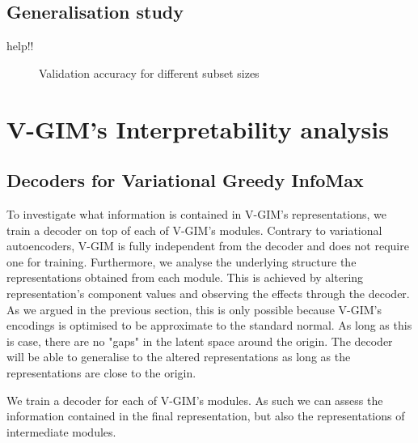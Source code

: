 	\subsection{Generalisation study}
		help!!
		
		\begin{figure}[h] %
			\centering
			\begin{subfigure}[b]{0.4\textwidth}
				\centering
				
			\end{subfigure}
			\hfill
			\begin{subfigure}[b]{0.4\textwidth}
				\centering
				
			\end{subfigure}
			\caption{Validation accuracy for different subset sizes}
		\end{figure}






	


\section{V-GIM's Interpretability analysis}

	\subsection{Decoders for Variational Greedy InfoMax}
		To investigate what information is contained in V-GIM's representations, we train a decoder on top of each of V-GIM's modules. Contrary to variational autoencoders, V-GIM is fully independent from the decoder and does not require one for training. Furthermore, we analyse the underlying structure the representations obtained from each module. This is achieved by altering representation's component values and observing the effects through the decoder. As we argued in the previous section, this is only possible because V-GIM's encodings is optimised to be approximate to the standard normal. As long as this is case, there are no "gaps" in the latent space around the origin. The decoder will be able to generalise to the altered representations as long as the representations are close to the origin.
		
		We train a decoder for each of V-GIM's modules. As such we can assess the information contained in the final representation, but also the representations of intermediate modules.
		
